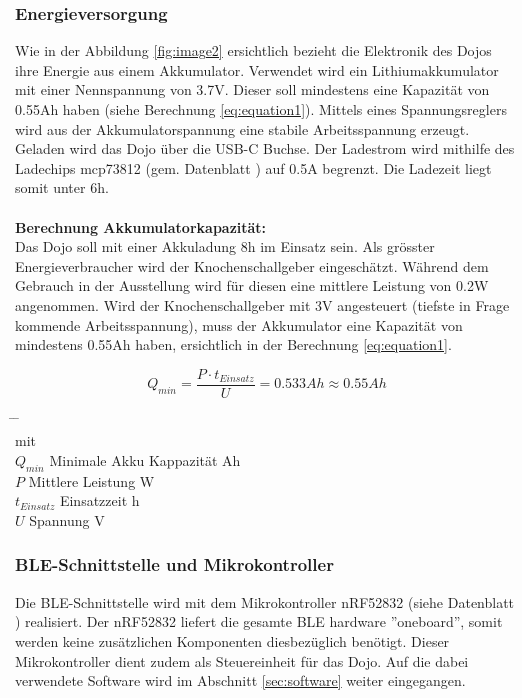 \documentclass[10pt,a4paper,oneside]{99_fhnwreport}
\begin{document}
\subsubsection{Energieversorgung}
Wie in der Abbildung \ref{fig:image2} ersichtlich bezieht die Elektronik des Dojos ihre Energie aus einem Akkumulator. Verwendet wird ein Lithiumakkumulator mit einer Nennspannung von 3.7V. Dieser soll mindestens eine Kapazität von 0.55Ah haben (siehe Berechnung \ref{eq:equation1}). Mittels eines Spannungsreglers wird aus der Akkumulatorspannung eine stabile Arbeitsspannung erzeugt. Geladen wird das Dojo über die USB-C Buchse. Der Ladestrom wird mithilfe des Ladechips mcp73812 (gem. Datenblatt \cite{MCP73811}) auf 0.5A begrenzt. Die Ladezeit liegt somit unter 6h.\\
\\
\textbf{Berechnung Akkumulatorkapazität:}\\
Das Dojo soll mit einer Akkuladung 8h im Einsatz sein. Als grösster Energieverbraucher wird der Knochenschallgeber eingeschätzt. Während dem Gebrauch in der Ausstellung wird für diesen eine mittlere Leistung von 0.2W angenommen. Wird der Knochenschallgeber mit 3V angesteuert (tiefste in Frage kommende Arbeitsspannung), muss der Akkumulator eine Kapazität von mindestens 0.55Ah haben, ersichtlich in der Berechnung \ref{eq:equation1}.

\begin{equation}
Q_{min} = \frac{P \cdot t_{Einsatz}}{U} = 0.533Ah \approx 0.55Ah
\label{eq:equation1}
\end{equation}
\begin{tabbing}
\hspace{20mm}	\=  \hspace{60mm} \= \hspace{30mm}	\= 	\\
mit	\\
$Q_{min}$	\> Minimale Akku Kappazität	 Ah	\>	\\
$P$		\> Mittlere Leistung		 W \>	\\
$t_{Einsatz}$	\> Einsatzzeit			 h	\\
$U$		\> Spannung			 V	\\
\end{tabbing}

\subsubsection{BLE-Schnittstelle und Mikrokontroller}
Die BLE-Schnittstelle wird mit dem Mikrokontroller nRF52832 (siehe Datenblatt \cite{NRF52832}) realisiert. Der nRF52832 liefert die gesamte BLE hardware ''oneboard'', somit werden keine zusätzlichen Komponenten diesbezüglich benötigt. Dieser Mikrokontroller dient zudem als Steuereinheit für das Dojo. Auf die dabei verwendete Software wird im Abschnitt \ref{sec:software} weiter eingegangen.
\end{document}
